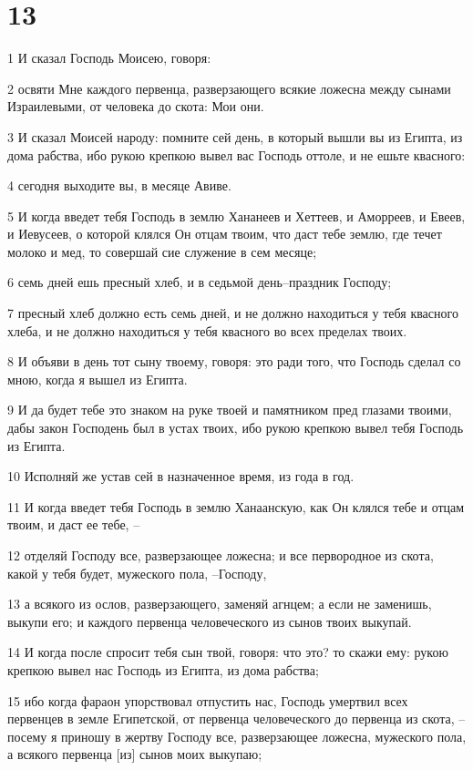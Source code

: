 \chapter{13}

\par 1 И сказал Господь Моисею, говоря:
\par 2 освяти Мне каждого первенца, разверзающего всякие ложесна между сынами Израилевыми, от человека до скота: Мои они.
\par 3 И сказал Моисей народу: помните сей день, в который вышли вы из Египта, из дома рабства, ибо рукою крепкою вывел вас Господь оттоле, и не ешьте квасного:
\par 4 сегодня выходите вы, в месяце Авиве.
\par 5 И когда введет тебя Господь в землю Хананеев и Хеттеев, и Аморреев, и Евеев, и Иевусеев, о которой клялся Он отцам твоим, что даст тебе землю, где течет молоко и мед, то совершай сие служение в сем месяце;
\par 6 семь дней ешь пресный хлеб, и в седьмой день--праздник Господу;
\par 7 пресный хлеб должно есть семь дней, и не должно находиться у тебя квасного хлеба, и не должно находиться у тебя квасного во всех пределах твоих.
\par 8 И объяви в день тот сыну твоему, говоря: это ради того, что Господь сделал со мною, когда я вышел из Египта.
\par 9 И да будет тебе это знаком на руке твоей и памятником пред глазами твоими, дабы закон Господень был в устах твоих, ибо рукою крепкою вывел тебя Господь из Египта.
\par 10 Исполняй же устав сей в назначенное время, из года в год.
\par 11 И когда введет тебя Господь в землю Ханаанскую, как Он клялся тебе и отцам твоим, и даст ее тебе, --
\par 12 отделяй Господу все, разверзающее ложесна; и все первородное из скота, какой у тебя будет, мужеского пола, --Господу,
\par 13 а всякого из ослов, разверзающего, заменяй агнцем; а если не заменишь, выкупи его; и каждого первенца человеческого из сынов твоих выкупай.
\par 14 И когда после спросит тебя сын твой, говоря: что это? то скажи ему: рукою крепкою вывел нас Господь из Египта, из дома рабства;
\par 15 ибо когда фараон упорствовал отпустить нас, Господь умертвил всех первенцев в земле Египетской, от первенца человеческого до первенца из скота, --посему я приношу в жертву Господу все, разверзающее ложесна, мужеского пола, а всякого первенца [из] сынов моих выкупаю;
